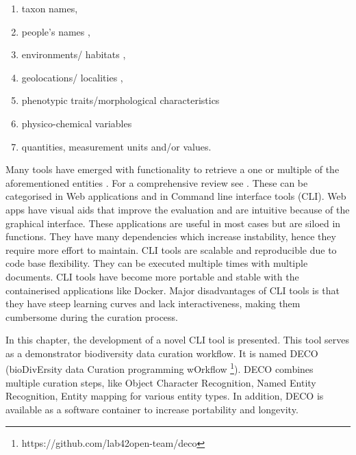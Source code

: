 \begin{enumerate}

    \item taxon names,
    \item people’s names \parencite{page_text-mining_2019,groom_people_2020},
    \item environments/ habitats \parencite{pafilis_environments_2015,pafilis_extract_2017},
    \item geolocations/ localities \parencite{alex_adapting_2015,stahlman_geoparsing_2019},
    \item phenotypic traits/morphological characteristics \parencite{thessen_automated_2018}
    \item physico-chemical variables
    \item quantities, measurement units and/or values.

\end{enumerate}

Many tools have emerged with functionality to retrieve a one or multiple 
of the aforementioned entities \parencite{batista-navarro_text_2017,10.3897/BDJ.7.e28737,dimitrova_pensoft_2020,le_guillarme_taxonerd_2022}.
For a comprehensive review see \textcite{Paragkamian2022}.
These can be categorised in Web applications and in Command line interface tools (CLI).
Web apps have visual aids that improve the evaluation and are intuitive because of
the graphical interface.
These applications are useful in most cases but are siloed in functions.
They have many dependencies which increase instability, hence they require more effort to maintain.
CLI tools are scalable and reproducible due to code base flexibility.
They can be executed multiple times with multiple documents.
CLI tools have become more portable and stable with the containerised applications like Docker.
Major disadvantages of CLI tools is that they have steep learning curves
and lack interactiveness, making them cumbersome during the curation process.

In this chapter, the development of a novel CLI tool is presented. This tool serves
as a demonstrator biodiversity data curation workflow. 
It is named DECO (bioDivErsity data Curation programming wOrkflow \footnote{https://github.com/lab42open-team/deco}).
DECO combines multiple curation steps, like Object Character Recognition, Named Entity Recognition, Entity mapping
for various entity types. In addition, DECO is available as a software container 
to increase portability and longevity.


